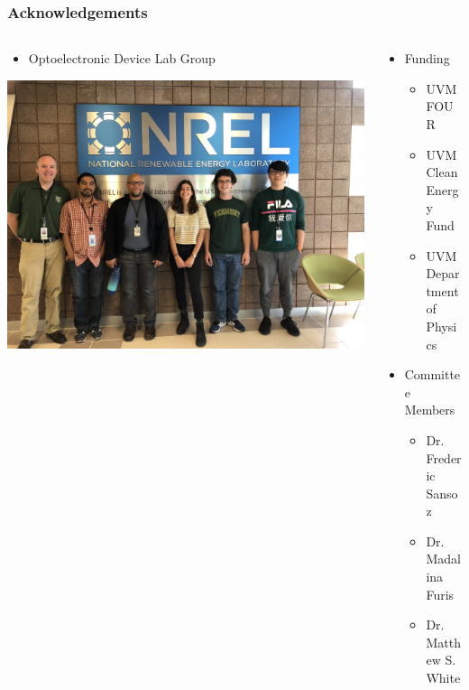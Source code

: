 \documentclass{beamer}
\begin{document}
    \begin{frame}
        \frametitle{Acknowledgements}
        \begin{columns}
			\begin{column}{0.4\textwidth}
				\begin{itemize}
					\item Optoelectronic Device Lab Group
				\end{itemize}
				\vspace{1cm}
				\centering
				\includegraphics[width=\textwidth]{images/nrel_group_pic.jpg}
			\end{column}
			\begin{column}{0.6\textwidth}
				\begin{itemize}
					\item Funding
					\begin{itemize}
						\item UVM FOUR
						\item UVM Clean Energy Fund
						\item UVM Department of Physics
					\end{itemize}
					\vspace{1cm}
					\item Committee Members
					\begin{itemize}
						\item Dr. Frederic Sansoz
						\item Dr. Madalina Furis
						\item Dr. Matthew S. White
					\end{itemize}
				\end{itemize}
			\end{column}
        \end{columns}
    \end{frame}
    
\end{document}
